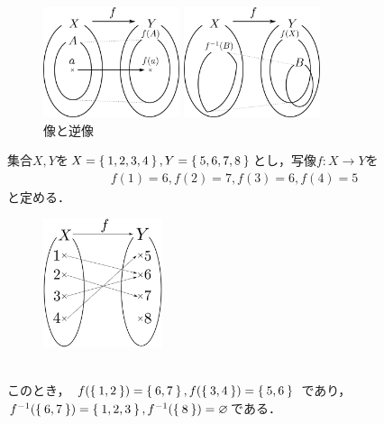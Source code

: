     \begin{figure}[h]
      \centering
      \begin{minipage}{.45 \linewidth}
        \centering
        \includegraphics[width=4cm]{inputyou/set/picture/map01.pdf}
      \end{minipage}
      \begin{minipage}{.45 \linewidth}
        \centering
        \includegraphics[width=4cm]{inputyou/set/picture/map02.pdf}
      \end{minipage}
      \caption{像と逆像}
      \label{fig:imagemap}
    \end{figure}
    \begin{ex} \label{ex:imagemap}
      集合$X,  Y$を$X = \Set{1,  2,  3,  4} ,  
      Y= \Set{ 5,  6,  7,  8}$とし，写像$f: X \longrightarrow Y$を
      \begin{align*}
        f(1) =6,  f(2) =7,  f(3) = 6 , f(4) = 5
      \end{align*}
      と定める．
      \begin{figure}[h]
        \centering
        \includegraphics[width=3.5cm]{inputyou/set/picture/mapex.pdf}
      \end{figure}
      \\
      このとき，
      $f( \Set{1,  2}) = \Set{6,  7},  f( \Set{3,  4}) = \Set{5,  6}$
      であり，
      $f^{-1}(\Set{6,  7}) = \Set{1,  2,  3} ,  
      f^{-1}(\Set{8}) = \varnothing$である．
    \end{ex}

